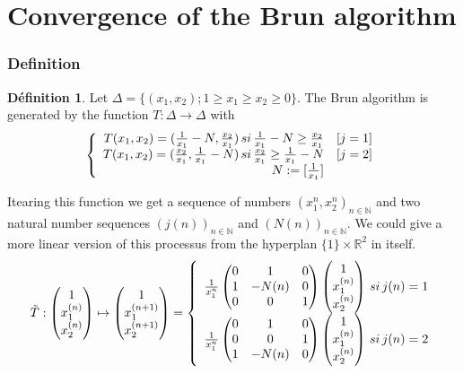 \documentclass[12pt]{article}
\theoremstyle{plain}%
\theoremstyle{definition}
\newtheorem{dfnt}{Définition}[section]
\theoremstyle{remark}
\begin{document}
\part*{Convergence of the Brun algorithm}
\section{Definition}

\begin{dfnt}
Let $\Delta=\{(x_1,x_2); 1 \geq x_1 \geq x_2 \geq 0\}$. The Brun algorithm is generated by the function $T: \Delta \to \Delta$ with
\[
\left \{
\begin{array}{r c }
T(x_1,x_2)=(\frac{1}{x_1}-N,\frac{x_2}{x_1}) \, si \, \frac{1}{x_1}-N \geq \frac{x_2}{x_1} & [j=1] \\
T(x_1,x_2)=(\frac{x_2}{x_1},\frac{1}{x_1}-N) \, si \, \frac{x_2}{x_1} \geq  \frac{1}{x_1}-N & [j=2] \\
N:=[\frac{1}{x_1}]
\end{array}
\right .
\]
\end{dfnt}
Itearing this function we get a sequence of numbers $(x_1^n,x_2^n)_{n \in \mathbb{N}}$ and two natural number sequences $(j(n))_{n \in \mathbb{N}}$ and $(N(n))_{n \in \mathbb{N}}$.
We could give a more linear version of this processus from the hyperplan $ \{1 \} \times \mathbb{R}^2  $ in itself.
\[
\tilde{T}:\begin{pmatrix} 1 \\ x_1^{(n)} \\ x_2^{(n)} \end{pmatrix} \mapsto \begin{pmatrix} 1 \\ x_1^{(n+1)} \\ x_2^{(n+1)} \end{pmatrix} = \left \{
\begin{array}{r c}
\frac{1}{x_1^n}\begin{pmatrix} 0 & 1 & 0 \\1 & -N(n) & 0 \\0 & 0& 1 \end{pmatrix} \begin{pmatrix} 1 \\ x_1^{(n)} \\ x_2^{(n)} \end{pmatrix} \, si \, j(n)=1\\
\frac{1}{x_1^n}\begin{pmatrix} 0 & 1 & 0 \\0 & 0 & 1 \\1 & -N(n) & 0 \end{pmatrix} \begin{pmatrix} 1 \\ x_1^{(n)} \\ x_2^{(n)} \end{pmatrix}\, si \, j(n)=2\\
\end{array}
\right .
\]
\end{document}
